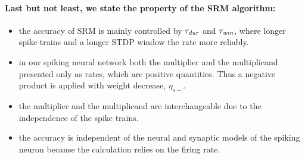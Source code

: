 
\paragraph{Last but not least, we state the property of the SRM algorithm:}
\begin{itemize}
	\item the accuracy of SRM is mainly controlled by $\tau_{\textit{\textrm{dur}}}$ and $\tau_{\textit{\textrm{win}}}$, where longer spike trains and a longer STDP window \DIFdelbegin {}\DIFdelend \DIFaddbegin {}\DIFaddend the rate more reliably.
	\item in our spiking neural network both the multiplier and the multiplicand \DIFdelbegin {}\DIFdelend \DIFaddbegin {}\DIFaddend presented only as rates, which are positive quantities.
	Thus a negative product is applied with weight decrease, $\eta_{s-}$. 
	\item the multiplier and the multiplicand are interchangeable due to the independence of the spike trains. 
	\item the accuracy is independent of the neural and synaptic models of the spiking neuron because the calculation relies \DIFaddbegin {}\DIFaddend on the firing rate\DIFdelbegin {}\DIFdelend .
\end{itemize}


